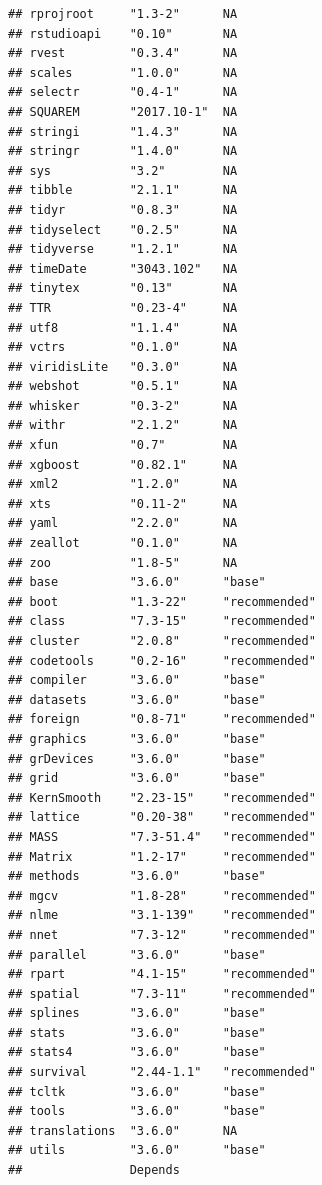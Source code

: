 \documentclass[]{article}
\begin{document}
\begin{verbatim}
## rprojroot     "1.3-2"      NA           
## rstudioapi    "0.10"       NA           
## rvest         "0.3.4"      NA           
## scales        "1.0.0"      NA           
## selectr       "0.4-1"      NA           
## SQUAREM       "2017.10-1"  NA           
## stringi       "1.4.3"      NA           
## stringr       "1.4.0"      NA           
## sys           "3.2"        NA           
## tibble        "2.1.1"      NA           
## tidyr         "0.8.3"      NA           
## tidyselect    "0.2.5"      NA           
## tidyverse     "1.2.1"      NA           
## timeDate      "3043.102"   NA           
## tinytex       "0.13"       NA           
## TTR           "0.23-4"     NA           
## utf8          "1.1.4"      NA           
## vctrs         "0.1.0"      NA           
## viridisLite   "0.3.0"      NA           
## webshot       "0.5.1"      NA           
## whisker       "0.3-2"      NA           
## withr         "2.1.2"      NA           
## xfun          "0.7"        NA           
## xgboost       "0.82.1"     NA           
## xml2          "1.2.0"      NA           
## xts           "0.11-2"     NA           
## yaml          "2.2.0"      NA           
## zeallot       "0.1.0"      NA           
## zoo           "1.8-5"      NA           
## base          "3.6.0"      "base"       
## boot          "1.3-22"     "recommended"
## class         "7.3-15"     "recommended"
## cluster       "2.0.8"      "recommended"
## codetools     "0.2-16"     "recommended"
## compiler      "3.6.0"      "base"       
## datasets      "3.6.0"      "base"       
## foreign       "0.8-71"     "recommended"
## graphics      "3.6.0"      "base"       
## grDevices     "3.6.0"      "base"       
## grid          "3.6.0"      "base"       
## KernSmooth    "2.23-15"    "recommended"
## lattice       "0.20-38"    "recommended"
## MASS          "7.3-51.4"   "recommended"
## Matrix        "1.2-17"     "recommended"
## methods       "3.6.0"      "base"       
## mgcv          "1.8-28"     "recommended"
## nlme          "3.1-139"    "recommended"
## nnet          "7.3-12"     "recommended"
## parallel      "3.6.0"      "base"       
## rpart         "4.1-15"     "recommended"
## spatial       "7.3-11"     "recommended"
## splines       "3.6.0"      "base"       
## stats         "3.6.0"      "base"       
## stats4        "3.6.0"      "base"       
## survival      "2.44-1.1"   "recommended"
## tcltk         "3.6.0"      "base"       
## tools         "3.6.0"      "base"       
## translations  "3.6.0"      NA           
## utils         "3.6.0"      "base"       
##               Depends                                                                  

\end{verbatim}
\end{document}
